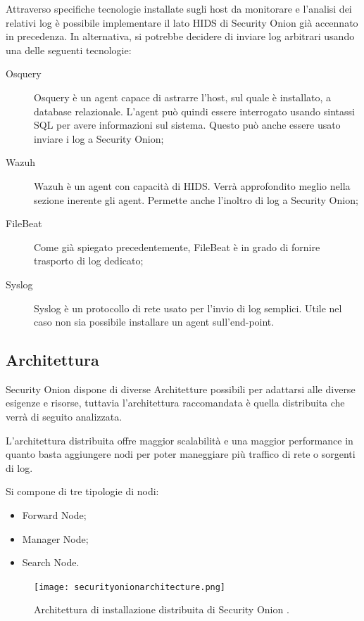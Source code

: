 Attraverso specifiche tecnologie installate sugli host da monitorare e l'analisi dei relativi log è possibile implementare il lato HIDS di Security Onion già accennato in precedenza.
In alternativa, si potrebbe decidere di inviare log arbitrari usando una delle seguenti tecnologie:
\begin{description}
    \item[Osquery] Osquery \cite{osquery} è un agent  capace di astrarre l'host, sul quale è installato, a database relazionale. L'agent può quindi essere interrogato usando sintassi SQL per avere informazioni sul sistema. Questo può anche essere usato inviare i log a Security Onion;
    \item[Wazuh] Wazuh \cite{wazuh} è un agent con capacità di HIDS. Verrà approfondito meglio nella sezione inerente gli agent. Permette anche l'inoltro di log a Security Onion;
    \item[FileBeat] Come già spiegato precedentemente, FileBeat \cite{filebeat} è in grado di fornire trasporto di log dedicato;
    \item [Syslog] Syslog \cite{syslog} è un protocollo di rete usato per l'invio di log semplici. Utile nel caso non sia possibile installare un agent sull'end-point.
\end{description}

\subsection{Architettura}
Security Onion dispone di diverse Architetture possibili per adattarsi alle diverse esigenze e risorse, tuttavia l'architettura raccomandata è quella distribuita che verrà di seguito analizzata.

L'architettura distribuita offre maggior scalabilità e una maggior performance in quanto basta aggiungere nodi per poter maneggiare più traffico di rete o sorgenti di log.

Si compone di  tre tipologie di nodi:
\begin{itemize}
    \item Forward Node;
    \item Manager Node;
    \item Search Node.
\end{itemize}

\begin{figure}[hbtp]
    \centering
    \texttt{[image: securityonionarchitecture.png]}
    \caption{Architettura di installazione distribuita di Security Onion \cite{securityonionimage}.}
    \label{fig:securityonionarchitecture}
\end{figure}



